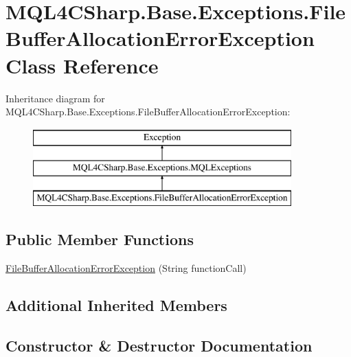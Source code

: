 \hypertarget{class_m_q_l4_c_sharp_1_1_base_1_1_exceptions_1_1_file_buffer_allocation_error_exception}{}\section{M\+Q\+L4\+C\+Sharp.\+Base.\+Exceptions.\+File\+Buffer\+Allocation\+Error\+Exception Class Reference}
\label{class_m_q_l4_c_sharp_1_1_base_1_1_exceptions_1_1_file_buffer_allocation_error_exception}
Inheritance diagram for M\+Q\+L4\+C\+Sharp.\+Base.\+Exceptions.\+File\+Buffer\+Allocation\+Error\+Exception\+:\begin{figure}[H]
\begin{center}
\leavevmode
\includegraphics[height=3.000000cm]{class_m_q_l4_c_sharp_1_1_base_1_1_exceptions_1_1_file_buffer_allocation_error_exception}
\end{center}
\end{figure}
\subsection*{Public Member Functions}
\begin{DoxyCompactItemize}
\item 
\hyperlink{class_m_q_l4_c_sharp_1_1_base_1_1_exceptions_1_1_file_buffer_allocation_error_exception_ab8b5a470b3bc225dc1e2c2b09c45431c}{File\+Buffer\+Allocation\+Error\+Exception} (String function\+Call)
\end{DoxyCompactItemize}
\subsection*{Additional Inherited Members}


\subsection{Constructor \& Destructor Documentation}
